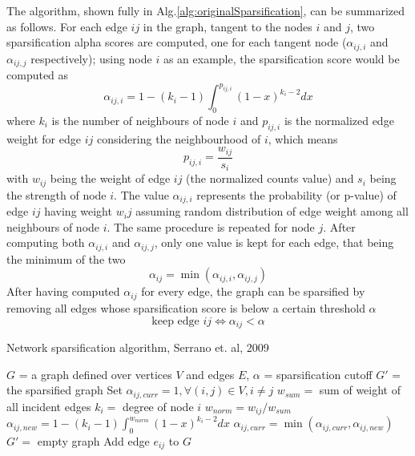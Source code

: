 The algorithm, shown fully in Alg.\ref{alg:originalSparsification}, can be summarized as follows. For each edge $ij$ in the graph, tangent to the nodes $i$ and $j$, two sparsification alpha scores are computed, one for each tangent node ($\alpha_{ij,i}$ and $\alpha_{ij,j}$ respectively); using node $i$ as an example, the sparsification score would be computed as
$$\alpha_{ij,i} = 1 - (k_i-1) \int_0^{p_{ij,i}}(1-x)^{k_i-2}dx$$
where $k_i$ is the number of neighbours of node $i$ and $p_{ij,i}$ is the normalized edge weight for edge $ij$ considering the neighbourhood of $i$, which means 
$$p_{ij,i} = \frac{w_{ij}}{s_i}$$ 
with $w_{ij}$ being the weight of edge $ij$ (the normalized counts value) and $s_i$ being the strength of node $i$. The value $\alpha_{ij,i}$ represents the probability (or p-value) of edge $ij$ having weight $w_ij$ assuming random distribution of edge weight among all neighbours of node $i$.
The same procedure is repeated for node $j$.
After computing both $\alpha_{ij,i}$ and $\alpha_{ij,j}$, only one value is kept for each edge, that being the minimum of the two
$$\alpha_{ij} = \min(\alpha_{ij,i}, \alpha_{ij,j})$$
After having computed $\alpha_{ij}$ for every edge, the graph can be sparsified by removing all edges whose sparsification score is below a certain threshold $\alpha$
$$\text{keep edge } ij \iff \alpha_{ij} < \alpha$$

\begin{algorithm}
\caption{Network sparsification algorithm, Serrano et. al, 2009}\label{alg:originalSparsification}
\begin{algorithmic}[1]
\Require $G$ = a graph defined over vertices $V$ and edges $E$, $\alpha$ = sparsification cutoff
\Ensure $G'$ = the sparsified graph
\State Set $\alpha_{ij, curr} = 1, \forall (i,j) \in V, i \neq j$ 
    \State $w_{sum} =$ sum of weight of all incident edges
    \State $k_i =$ degree of node $i$ 
      \State $w_{norm} = w_{ij} / w_{sum}$
      \State $\alpha_{ij, new} = 1 - (k_i-1) \int_0^{w_{norm}}(1-x)^{k_i-2}dx$
      \State $\alpha_{ij, curr} = \min(\alpha_{ij, curr},\alpha_{ij, new})$
    \EndFor
\EndFor
\State $G' =$ empty graph
        \State Add edge $e_{ij}$ to $G$
    \EndIf
\EndFor
\end{algorithmic}
\end{algorithm}

